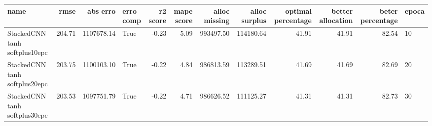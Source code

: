 \begin{tabular}{lrrlrrrrrrrl}
\toprule
name & rmse & abs erro & erro comp & r2 score & mape score & alloc missing & alloc surplus & optimal percentage & better allocation & beter percentage & epoca \\
\midrule
StackedCNN tanh softplus10epc & 204.71 & 1107678.14 & True & -0.23 & 5.09 & 993497.50 & 114180.64 & 41.91 & 41.91 & 82.54 & 10 \\
StackedCNN tanh softplus20epc & 203.75 & 1100103.10 & True & -0.22 & 4.84 & 986813.59 & 113289.51 & 41.69 & 41.69 & 82.69 & 20 \\
StackedCNN tanh softplus30epc & 203.53 & 1097751.79 & True & -0.22 & 4.71 & 986626.52 & 111125.27 & 41.31 & 41.31 & 82.73 & 30 \\
\bottomrule
\end{tabular}
